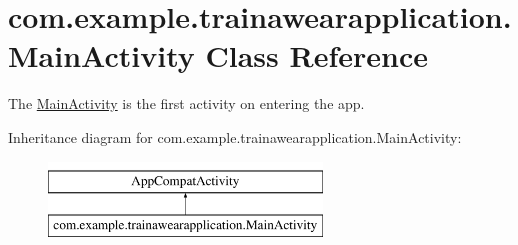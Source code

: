 \hypertarget{classcom_1_1example_1_1trainawearapplication_1_1_main_activity}{}\section{com.\+example.\+trainawearapplication.\+Main\+Activity Class Reference}
\label{classcom_1_1example_1_1trainawearapplication_1_1_main_activity}


The \mbox{\hyperlink{classcom_1_1example_1_1trainawearapplication_1_1_main_activity}{Main\+Activity}} is the first activity on entering the app.  


Inheritance diagram for com.\+example.\+trainawearapplication.\+Main\+Activity\+:\begin{figure}[H]
\begin{center}
\leavevmode
\includegraphics[height=2.000000cm]{classcom_1_1example_1_1trainawearapplication_1_1_main_activity}
\end{center}
\end{figure}
